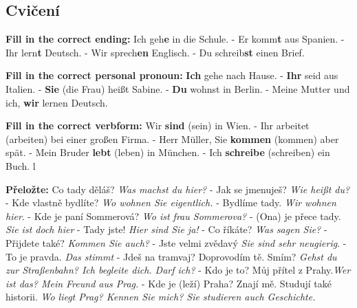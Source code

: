   \subsection*{Cvičení}
    \begin{example}\textbf{Fill in the correct ending:}\newline
      Ich geh\textbf{e} in die Schule. - Er komm\textbf{t} aus Spanien. - Ihr lern\textbf{t} 
      Deutsch. - Wir sprech\textbf{en} Englisch. - Du schreib\textbf{st} einen Brief.
    \end{example}

    \begin{example}\textbf{Fill in the correct personal pronoun:}\newline
     \textbf{Ich} gehe nach Hause. - \textbf{Ihr} seid aus Italien. - \textbf{Sie} (die Frau) 
     hei{\ss}t Sabine. - \textbf{Du} wohnst in Berlin. - Meine Mutter und ich, \textbf{wir} lernen 
     Deutsch.     
    \end{example}
    
    \begin{example}\textbf{Fill in the correct verbform:}\newline
      Wir \textbf{sind} (sein) in Wien. - Ihr arbeitet (arbeiten) bei einer gro{\ss}en Firma. - 
      Herr M{\"u}ller, Sie \textbf{kommen} (kommen) aber sp{\"a}t. - Mein Bruder \textbf{lebt} 
      (leben) in M{\"u}nchen. - Ich \textbf{schreibe} (schreiben) ein Buch. 
l    \end{example}

    \begin{example}\textbf{Přeložte:}\newline
      Co tady děláš? \emph{Was machst du hier?} - Jak se jmenuješ? \emph{Wie hei{\ss}t du?} - Kde 
      vlastně bydlíte? \emph{Wo wohnen Sie eigentlich.} - Bydlíme tady. \emph{Wir wohnen hier}. - 
      Kde je paní Sommerová? \emph{Wo ist frau Sommerova?} - (Ona) je přece tady. \emph{Sie ist 
      doch hier} - Tady jste! \emph{Hier sind Sie ja!} - Co říkáte? \emph{Was sagen Sie?} - 
      Přijdete také? \emph{Kommen Sie auch?} - Jste velmi zvědavý \emph{Sie sind sehr neugierig}. - 
      To je pravda. \emph{Das stimmt} - Jdeš na tramvaj? Doprovodím tě. Smím? \emph{Gehst du zur 
      Straßenbahn? Ich begleite dich. Darf ich?} - Kdo je to? Můj přítel z Prahy.\emph{Wer ist das? 
      Mein Freund aus Prag.} -  Kde je (leží) Praha? Znají mě. Studují také historii. \emph{Wo 
      liegt Prag? Kennen Sie mich? Sie studieren auch Geschichte.}
    \end{example}